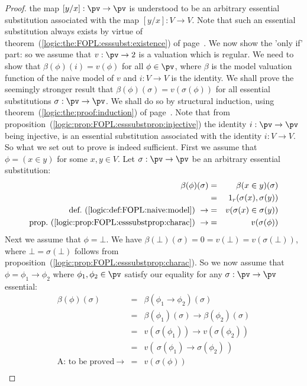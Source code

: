 \begin{proof}
the map $[y/x]:\pv\to\pv$ is understood to be an arbitrary essential
substitution associated with the map $[y/x]:V\to V$. Note that such
an essential substitution always exists by virtue of
theorem~(\ref{logic:the:FOPL:esssubst:existence}) of
page~\pageref{logic:the:FOPL:esssubst:existence}. We now show the
'only if' part: so we assume that $v:\pv\to 2$ is a valuation which
is regular. We need to show that $\beta(\phi)(i)=v(\phi)$ for all
$\phi\in\pv$, where $\beta$ is the model valuation function of the
naive model of $v$ and $i:V\to V$ is the identity. We shall prove
the seemingly stronger result that
$\beta(\phi)(\sigma)=v(\sigma(\phi))$ for all essential
substitutions $\sigma:\pv\to\pv$. We shall do so by structural
induction, using theorem~(\ref{logic:the:proof:induction}) of
page~\pageref{logic:the:proof:induction}. Note that from
proposition~(\ref{logic:prop:FOPL:esssubstprop:injective}) the
identity $i:\pv\to\pv$ being injective, is an essential substitution
associated with the identity $i:V\to V$. So what we set out to prove
is indeed sufficient. First we assume that $\phi=(x\in y)$ for some
$x,y\in V$. Let $\sigma:\pv\to\pv$ be an arbitrary essential
substitution:
    \begin{eqnarray*}
    \beta(\phi)(\sigma)&=&\beta(x\in y)(\sigma)\\
        &=&1_{r}(\sigma(x),\sigma(y))\\
        \mbox{def.~(\ref{logic:def:FOPL:naive:model})}\ \rightarrow
        &=&v(\sigma(x)\in \sigma(y))\\
        \mbox{prop.~(\ref{logic:prop:FOPL:esssubstprop:charac})}\ \rightarrow
        &=&v(\sigma(\phi))\\
    \end{eqnarray*}
Next we assume that $\phi=\bot$. We have
$\beta(\bot)(\sigma)=0=v(\bot)=v(\sigma(\bot))$, where
$\bot=\sigma(\bot)$ follows from
proposition~(\ref{logic:prop:FOPL:esssubstprop:charac}). So we now
assume that $\phi=\phi_{1}\to\phi_{2}$ where
$\phi_{1},\phi_{2}\in\pv$ satisfy our equality for any
$\sigma:\pv\to\pv$ essential:
    \begin{eqnarray*}
    \beta(\phi)(\sigma)&=&\beta(\phi_{1}\to\phi_{2})(\sigma)\\
    &=&\beta(\phi_{1})(\sigma)\to\beta(\phi_{2})(\sigma)\\
    &=&v(\sigma(\phi_{1}))\to v(\sigma(\phi_{2}))\\
    &=&v(\,\sigma(\phi_{1})\to\sigma(\phi_{2})\,)\\
    \mbox{A: to be proved}\ \rightarrow&=&v(\sigma(\phi))\\

\end{eqnarray*}
\end{proof}
